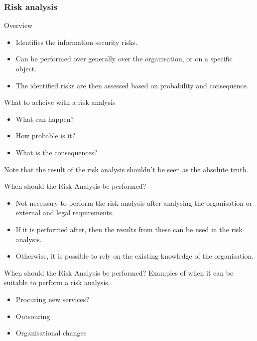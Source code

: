 \documentclass{beamer}
\begin{document}
\subsubsection{Risk analysis}
\begin{frame}{Overview}{\insertsubsubsectionhead}
  \begin{itemize}
    \item Identifies the information security risks.
    \item Can be performed over generally over the organisation, or on a
      specific object.
    \item The identified risks are then assessed based on probability and
      consequence.
  \end{itemize}
  \begin{block}{What to acheive with a risk analysis}
    \begin{itemize}
      \item What can happen?
      \item How probable is it?
      \item What is the consequences?
    \end{itemize}
    Note that the result of the risk analysis shouldn't be seen as the absolute
    truth.
  \end{block}
\end{frame}

\begin{frame}{When should the Risk Analysis be performed?}{\insertsubsubsectionhead}
  \begin{itemize}
    \item Not necessary to perform the risk analysis after analysing the
      organisation or external and legal requirements.
    \item If it is performed after, then the results from these can be used in
      the risk analysis.
    \item Otherwise, it is possible to rely on the existing knowledge of the
      organisation.
  \end{itemize}
\end{frame}
\begin{frame}{When should the Risk Analysis be performed?}{\insertsubsubsectionhead}
  Examples of when it can be suitable to perform a risk analysis.
  \begin{itemize}
    \item Procuring new services?
    \item Outsouring
    \item Organisational changes
  \end{itemize}
\end{frame}
\end{document}
